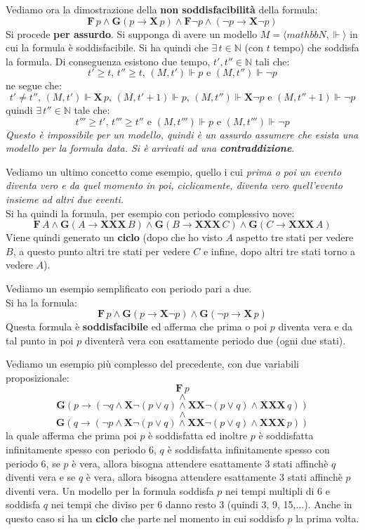 \documentclass[a4paper,12pt, oneside]{book}
\begin{document}
\begin{esempio}
  Vediamo ora la dimostrazione della \textbf{non soddisfacibilità} della
  formula:
  \[\mathbf{F}\,p\land \mathbf{G}(p\to \mathbf{X}\,p)\land \mathbf{F}\neg
    p\land \mathbf{}(\neg p\to \mathbf{X}\neg p)\]
  Si procede \textbf{per assurdo}. Si supponga di avere un modello $M=\langle
  mathbb{N},\Vdash\rangle$ in cui la formula è soddisfacibile. Si ha quindi che
  $\exists\,t\in\mathbb{N}$ (con $t$ tempo) che soddisfa la formula. Di
  conseguenza esistono due tempo, $t',t''\in \mathbb{N}$ tali che:
  \[t'\geq t,\,t''\geq t,\,(M,t')\Vdash p \mbox{ e }(M,t'')\Vdash \neg p\]
  ne segue che:
  \[t'\neq t'',\,(M,t')\Vdash\mathbf{X}\,p,\,(M,t'+1)\Vdash
    p,\,(M,t'')\Vdash\mathbf{X}\neg p\mbox{ e }(M,t''+1)\Vdash \neg p\]
  quindi $\exists\,t''\in\mathbb{N}$ tale che:
  \[t'''\geq t',\,t'''\geq t''\mbox{ e }(M,t''')\Vdash p\mbox{ e
    }(M,t''')\Vdash \neg p\]
  \emph{Questo è impossibile per un modello, quindi è un assurdo assumere che
    esista una modello per la formula data. Si è arrivati ad una
    \textbf{contraddizione}}.
\end{esempio}
\newpage
Vediamo un ultimo concetto come esempio, quello i cui \textit{prima o poi un
  evento diventa vero e da quel momento in poi, ciclicamente, diventa vero
  quell'evento insieme ad altri due eventi.} \\
Si ha quindi la formula, per esempio con periodo complessivo nove:
\[\mathbf{F}\,A\land \mathbf{G}(A\to \mathbf{XXX}\,B)\land \mathbf{G}(B\to
  \mathbf{XXX}\,C)\land \mathbf{G}(C\to\mathbf{XXX}\,A)\]
Viene quindi generato un \textbf{ciclo} (dopo che ho visto $A$ aspetto tre stati
per vedere $B$, a questo punto altri tre stati per vedere $C$ e infine, dopo
altri tre stati torno a vedere $A$).
\begin{esempio}
  Vediamo un esempio semplificato con periodo pari a due.\\
  Si ha la formula:
  \[\mathbf{F}\,p\land \mathbf{G}(p\to \mathbf{X}\neg p)\land\mathbf{G}(\neg
    p\to\mathbf{X}\,p)\]
  Questa formula è \textbf{soddisfacibile} ed afferma che prima o poi $p$
  diventa vera e da tal punto in poi $p$ diventerà vera con esattamente periodo
  due (ogni due stati). 
\end{esempio}
\begin{esempio}
  Vediamo un esempio più complesso del precedente, con due variabili
  proposizionale: 
  \[\mathbf{F}\,p\]
  \[\land\]
  \[\mathbf{G}(p\to(\neg q\land \mathbf{X}\neg(p\lor q)\land
    \mathbf{XX}\neg(p\lor q)\land \mathbf{XXX}\,q))\]
  \[\land\]
  \[\mathbf{G}(q\to (\neg p\land \mathbf{X}\neg(p\lor q)\land \mathbf{XX}\neg
    (p\lor q)\land\mathbf{XXX}\,p))\] 
  la quale afferma che prima poi $p$ è soddisfatta ed inoltre $p$ è soddisfatta
  infinitamente spesso con periodo 6, $q$ è soddisfatta infinitamente spesso con
  periodo 6, se $p$ è vera, allora bisogna attendere esattamente 3 stati
  affinchè $q$ diventi vera e se $q$ è vera, allora bisogna attendere
  esattamente 3 stati affinchè $p$ diventi vera. Un modello per la formula
  soddisfa $p$ nei tempi multipli di 6 e soddisfa $q$ nei tempi che diviso per 6
  danno resto 3 (quindi 3, 9, 15,$\ldots$). Anche in questo caso si ha un
  \textbf{ciclo} che parte nel momento in cui soddisfo $p$ la prima volta.
\end{esempio}
\end{document}
